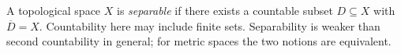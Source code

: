 
A topological space $X$ is \emph{separable} if there exists a countable subset $D\subseteq X$ with $\overline D=X$. Countability here may include finite sets. Separability is weaker than second countability in general; for metric spaces the two notions are equivalent.
